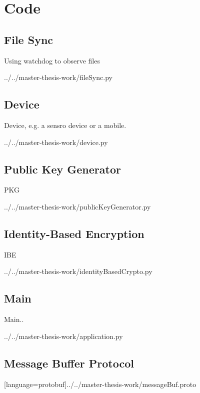 \chapter{Code}\label{apx:code}


\section{File Sync}\label{apx:file-sync-code}

Using watchdog to observe files

\begin{lstinputlisting}
[language=Python]{../../master-thesis-work/fileSync.py}
\end{lstinputlisting}

\section{Device}\label{apx:device-code}

Device, e.g. a sensro device or a mobile.

\begin{lstinputlisting}
[language=Python]{../../master-thesis-work/device.py}
\end{lstinputlisting}

\section{Public Key Generator}\label{apx:pkg-code}

\gls{PKG}

\begin{lstinputlisting}
[language=Python]{../../master-thesis-work/publicKeyGenerator.py}
\end{lstinputlisting}

\section{Identity-Based Encryption}\label{apx:ibe-code}

\gls{IBE}

\begin{lstinputlisting}
[language=Python]{../../master-thesis-work/identityBasedCrypto.py}
\end{lstinputlisting}

\section{Main}\label{apx:main-code}

Main..

\begin{lstinputlisting}
[language=Python]{../../master-thesis-work/application.py}
\end{lstinputlisting}

\section{Message Buffer Protocol}\label{apx:msgBuf-code}
[language=protobuf]{../../master-thesis-work/messageBuf.proto}